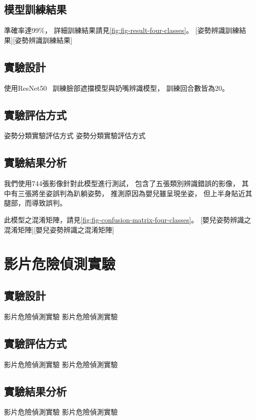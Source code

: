 \documentclass[class=NCU_thesis, crop=false]{standalone}
\begin{document}
\subsection{模型訓練結果}
準確率達99\%，
詳細訓練結果請見\cref{fig:fig-result-four-classes}。
[姿勢辨識訓練結果][姿勢辨識訓練結果]

\subsection{實驗設計}
使用ResNet50~\cite{he_deep_2016}
訓練臉部遮擋模型與奶嘴辨識模型，
訓練回合數皆為20。

\subsection{實驗評估方式}
姿勢分類實驗評估方式 姿勢分類實驗評估方式

\subsection{實驗結果分析}
我們使用744張影像針對此模型進行測試，
包含了五張類別辨識錯誤的影像，
其中有三張將坐姿誤判為趴躺姿勢，
推測原因為嬰兒雖呈現坐姿，
但上半身貼近其腿部，而導致誤判。

此模型之混淆矩陣，請見\cref{fig:fig-confusion-matrix-four-classes}。
[嬰兒姿勢辨識之混淆矩陣][嬰兒姿勢辨識之混淆矩陣]

\section{影片危險偵測實驗}
\subsection{實驗設計}
影片危險偵測實驗 影片危險偵測實驗

\subsection{實驗評估方式}
影片危險偵測實驗 影片危險偵測實驗

\subsection{實驗結果分析}
影片危險偵測實驗 影片危險偵測實驗
\end{document}
